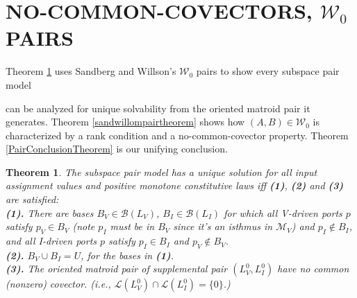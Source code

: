 \documentclass{article}
\newtheorem{theorem}{Theorem}
\newcommand{\extra}[1]{}
\begin{document}
\section{NO-COMMON-COVECTORS, $\mathcal{W}_0$ PAIRS}

Theorem \ref{SubspacePairTh} uses
Sandberg and Willson's 
$\mathcal{W}_0$ pairs
to show every 
subspace pair model 
\extra{(with  its separation of
geometric/topological and constitutive constraints)}
can be analyzed
for unique solvability from the oriented matroid pair it generates.
Theorem \ref{sandwillompairtheorem} shows how
$(A,B)\in\mathcal{W}_0$ is characterized by a rank condition and a 
no-common-covector property.  
Theorem \ref{PairConclusionTheorem} is our unifying conclusion.

\begin{theorem}
\label{SubspacePairTh}
The subspace pair model has a unique solution for all 
input assignment 
values and positive monotone constitutive laws iff 
\textbf{(1)}, \textbf{(2)} and \textbf{(3)} are satisfied:\\
\textbf{(1).} There are bases $B_V\in\mathcal{B}(L_V)$,
$B_I\in\mathcal{B}(L_I)$ for which all V-driven 
ports $p$ satisfy $p_V\in B_V$ (note $p_I$ must be 
in $B_V$ since it's an isthmus in $\mathcal{M}_V$) 
and $p_I\not\in B_I$,
and all I-driven ports $p$ satisfy $p_I\in B_I$ and 
$p_V \not\in B_V$.  \\
\textbf{(2).}
$B_V\cup B_I = U$, for the bases in \textbf{(1)}.\\
\textbf{(3).} The oriented matroid pair of supplemental pair $(L_V^0,L_I^0)$ 
have no common (nonzero) covector.
(i.e., $\mathcal{L}(L_V^0)\cap\mathcal{L}(L_I^0)=\{0\}$.)
\end{theorem}
\end{document}
